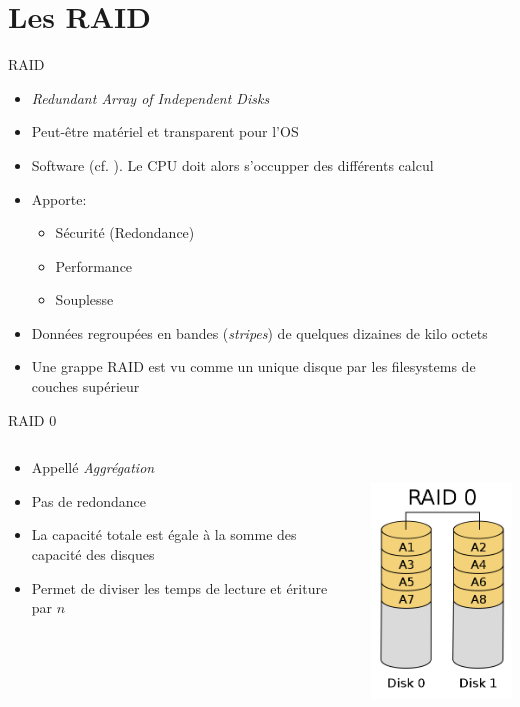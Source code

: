 \section{Les RAID}

\begin{frame}[fragile=singleslide]{RAID}
  \begin{itemize}
  \item \emph{Redundant Array of Independent Disks}
  \item Peut-être matériel et transparent pour l'OS
  \item Software (cf. ). Le CPU doit alors s'occupper des différents calcul
  \item Apporte: 
    \begin{itemize} 
    \item Sécurité (Redondance)
    \item Performance
    \item Souplesse 
    \end{itemize}
  \item Données regroupées en bandes (\emph{stripes}) de quelques dizaines de kilo octets
    \item Une grappe RAID est vu comme un unique disque par les filesystems de couches supérieur
  \end{itemize}
\end{frame}


\begin{frame}[fragile=singleslide]{RAID 0}
  \begin{columns}
    \begin{column}{6cm}
      \begin{itemize} 
      \item Appellé \emph{Aggrégation}
      \item Pas de redondance
      \item La capacité  totale est égale à la  somme des capacité des
        disques
      \item Permet de diviser les temps de lecture et ériture par $n$
      \end{itemize}  
    \end{column}
    \begin{column}{4cm}
      \includegraphics[height=7cm]{pics/RAID_0}
    \end{column}
  \end{columns}
\end{frame}

